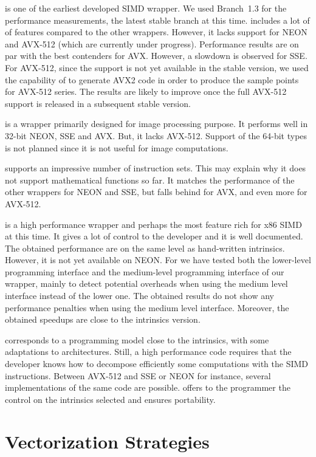 \textbf{\Vc} is one of the earliest developed SIMD \Cxx wrapper. We used
Branch~1.3 for the performance measurements, the latest stable branch at this
time. \Vc includes a lot of of features compared to the other wrappers. However,
it lacks support for NEON and AVX-512 (which are currently under progress).
Performance results are on par with the best contenders for AVX. However, a
slowdown is observed for SSE. For AVX-512, since the support is not yet
available in the stable version, we used the capability of \Vc to generate AVX2
code in order to produce the sample points for AVX-512 series. The results are
likely to improve once the full AVX-512 support is released in a subsequent
stable version.

\textbf{\TSIMD} is a wrapper primarily designed for image processing purpose.
It performs well in 32-bit NEON, SSE and AVX. But, it lacks AVX-512. Support of
the 64-bit types is not planned since it is not useful for image computations.

\textbf{\simdpp} supports an impressive number of instruction
sets. This may explain why it does not support mathematical functions so far. It
matches the performance of the other wrappers for NEON and SSE, but falls behind
for AVX, and even more for AVX-512.

\textbf{\VCL} is a high performance wrapper and perhaps the most feature rich
for x86 SIMD at this time. It gives a lot of control to the developer and it is
well documented. The obtained performance are on the same level as hand-written
intrinsics. However, it is not yet available on NEON.
For \MIPP we have tested both the lower-level programming interface and the
medium-level programming interface of our \MIPP wrapper, mainly to detect
potential overheads when using the medium level interface instead of the lower
one. The obtained results do not show any performance penalties when using the
\MIPP medium level interface. Moreover, the obtained speedups are close to the
intrinsics version.

\textbf{\MIPP} corresponds to a programming model close to the intrinsics, with
some adaptations to architectures. Still, a high performance code requires that
the developer knows how to decompose efficiently some computations with the SIMD
instructions. Between AVX-512 and SSE or NEON for instance, several
implementations of the same code are possible. \MIPP offers to the programmer
the control on the intrinsics selected and ensures portability.

\section{Vectorization Strategies}
\label{sec:opt_vec}


